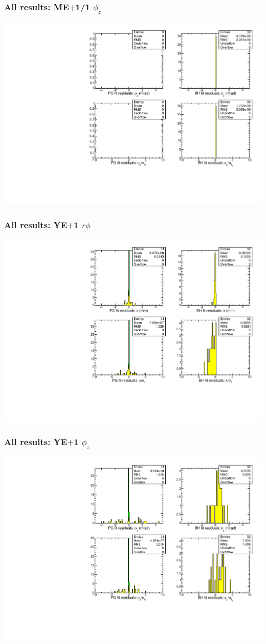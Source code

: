 \documentclass[compress]{beamer}
\begin{document}
\begin{frame}
\frametitle{All results: ME$+$1/1 $\phi_z$}
\includegraphics[width=\linewidth]{newplots_fitresiduals_MEp1_1_phiz.pdf}
\end{frame}
\begin{frame}
\frametitle{All results: YE$+$1 $r\phi$}
\includegraphics[width=\linewidth]{newplots_fitresiduals_YEp1_x.pdf}
\end{frame}
\begin{frame}
\frametitle{All results: YE$+$1 $\phi_z$}
\includegraphics[width=\linewidth]{newplots_fitresiduals_YEp1_phiz.pdf}
\end{frame}
\end{document}
